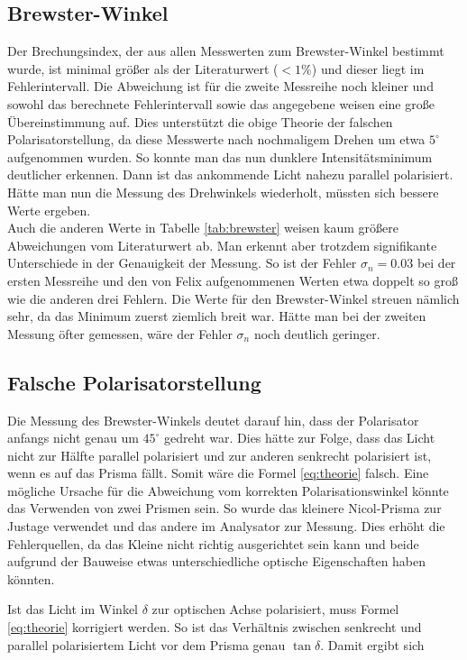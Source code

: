 \documentclass[12pt,a4paper,titlepage,headinclude,bibtotoc]{scrartcl}
\begin{document}
\subsection{Brewster-Winkel}
Der Brechungsindex, der aus allen Messwerten zum Brewster-Winkel bestimmt wurde, ist minimal größer als der Literaturwert ($< 1\%$) und dieser liegt im Fehlerintervall.
Die Abweichung ist für die zweite Messreihe noch kleiner und sowohl das berechnete Fehlerintervall sowie das angegebene weisen eine große Übereinstimmung auf.
Dies unterstützt die obige Theorie der falschen Polarisatorstellung, da diese Messwerte nach nochmaligem Drehen um etwa $5^\circ$ aufgenommen wurden.
So konnte man das nun dunklere Intensitätsminimum deutlicher erkennen.
Dann ist das ankommende Licht nahezu parallel polarisiert.
Hätte man nun die Messung des Drehwinkels wiederholt, müssten sich bessere Werte ergeben.\\

Auch die anderen Werte in Tabelle \ref{tab:brewster} weisen kaum größere Abweichungen vom Literaturwert ab.
Man erkennt aber trotzdem signifikante Unterschiede in der Genauigkeit der Messung.
So ist der Fehler $\sigma_n=0.03$ bei der ersten Messreihe und den von Felix aufgenommenen Werten etwa doppelt so groß wie die anderen drei Fehlern.
Die Werte für den Brewster-Winkel streuen nämlich sehr, da das Minimum zuerst ziemlich breit war.
Hätte man bei der zweiten Messung öfter gemessen, wäre der Fehler $\sigma_n$ noch deutlich geringer.

\subsection{Falsche Polarisatorstellung}
Die Messung des Brewster-Winkels deutet darauf hin, dass der Polarisator anfangs nicht genau um $45^\circ$ gedreht war.
Dies hätte zur Folge, dass das Licht nicht zur Hälfte parallel polarisiert und zur anderen senkrecht polarisiert ist, wenn es auf das Prisma fällt.
Somit wäre die Formel \eqref{eq:theorie} falsch.
Eine mögliche Ursache für die Abweichung vom korrekten Polarisationswinkel könnte das Verwenden von zwei Prismen sein.
So wurde das kleinere Nicol-Prisma zur Justage verwendet und das andere im Analysator zur Messung.
Dies erhöht die Fehlerquellen, da das Kleine nicht richtig ausgerichtet sein kann und beide aufgrund der Bauweise etwas unterschiedliche optische Eigenschaften haben könnten.

Ist das Licht im Winkel $\delta$ zur optischen Achse polarisiert, muss Formel \eqref{eq:theorie} korrigiert werden.
So ist das Verhältnis zwischen senkrecht und parallel polarisiertem Licht vor dem Prisma genau $\tan\delta$.
Damit ergibt sich
\end{document}
